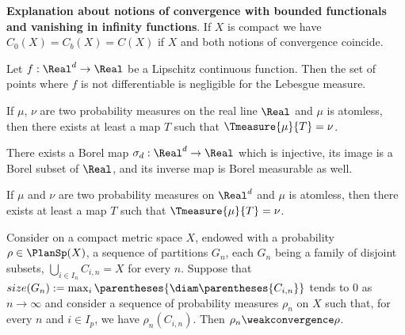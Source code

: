 \begin{definition}
		
\end{definition}


\textbf{Explanation about notions of convergence with bounded functionals and vanishing in infinity functions}. If $X$ is compact we have $C_0(X)=C_b(X)=C(X)$ if $X$ and both notions of convergence coincide.

\begin{theorem}[Rademacher]
	Let $f:\Real^d\rightarrow\Real$ be a Lipschitz continuous function. Then the set of points where $f$ is not differentiable is negligible for the Lebesgue measure.
\end{theorem}


\begin{lemma}
If $\mu$, $\nu$ are two probability measures on the real line $\Real$ and $\mu$ is atomless, then there exists at least a map $T$ such that $\Tmeasure{\mu}{T}=\nu$.
\end{lemma}

\begin{lemma}
There exists a Borel map $\sigma_d: \Real^d\rightarrow \Real$ which is injective, its image is a Borel subset of $\Real$, and its inverse map is Borel measurable as well.
\end{lemma}

\begin{theorem}
If $\mu$ and $\nu$ are two probability measures on $\Real^d$ and $\mu$ is atomless, then there exists at least a map $T$ such that $\Tmeasure{\mu}{T}=\nu$.
\end{theorem}

\begin{theorem}
	Consider on a compact metric space $X$, endowed with a probability $\rho \in \PlanSp(X)$, a sequence of partitions $G_n$, each $G_n$ being a family of disjoint subsets, $\bigcup_{i\in I_n}C_{i,n}=X$ for every $n$. Suppose that $size(G_n):=\max_i \parentheses{\diam\parentheses{C_{i,n}}}$ tends to $0$ as $n\rightarrow \infty$ and consider a sequence of probability measures $\rho_n$ on $X$ such that, for every $n$ and $i\in I_p$, we have $\rho_n(C_{i,n})$. Then $\rho_n\weakconvergence\rho$.
\end{theorem}